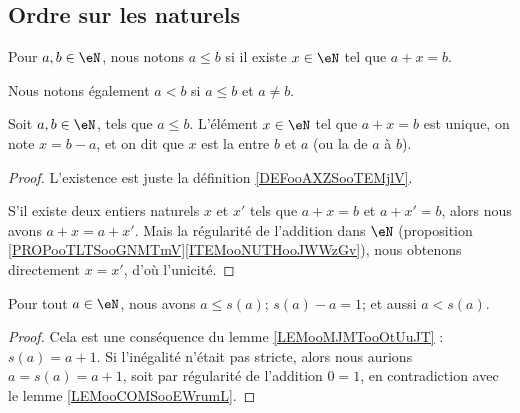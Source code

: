 \subsection{Ordre sur les naturels}
\label{SUBooOrdreNaturels}

\begin{definition}     \label{DEFooAXZSooTEMjlV}
	Pour \( a,b\in \eN\), nous notons \( a\leq b\) si il existe \( x\in \eN\) tel que \( a+x=b\).

	Nous notons également \( a<b \) si \( a\leq b\) et \( a\neq b\).
\end{definition}

\begin{propositionDef}	\label{PROPooDEFSoustractionN}    \label{LEMooVOTAooALatDu}
	Soit \( a,b\in \eN\), tels que \( a\leq b\). L'élément  \( x\in \eN\) tel que \( a+x=b\) est unique, on note \( x = b - a \), et on dit que \( x \) est la  entre \( b \) et \( a \)  (ou la  de \( a \) à \( b \)).
\end{propositionDef}

\begin{proof}
	L'existence est juste la définition \ref{DEFooAXZSooTEMjlV}.
	
	S'il existe deux entiers naturels \( x \) et \( x' \) tels que \( a + x = b \) et \( a + x' = b\), alors nous avons \( a + x = a + x' \). Mais la régularité de l'addition dans \( \eN \) (proposition \ref{PROPooTLTSooGNMTmV}\ref{ITEMooNUTHooJWWzGv}), nous obtenons directement \( x = x' \), d'où l'unicité.

\end{proof}

\begin{lemma}       \label{LEMooWMYPooLTMyWb}
	Pour tout \( a\in \eN\), nous avons \( a\leq s(a)\); \( s(a) - a = 1 \); et aussi \( a < s(a) \).
\end{lemma}

\begin{proof}
	Cela est une conséquence du lemme \ref{LEMooMJMTooOtUuJT} : \( s(a)=a+1\). Si l'inégalité n'était pas stricte, alors nous aurions \( a = s(a) = a + 1 \), soit par régularité de l'addition \( 0 = 1 \), en contradiction avec le lemme \ref{LEMooCOMSooEWrumL}.
\end{proof}

